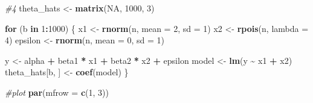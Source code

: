 \documentclass[
]{article}
\newenvironment{Shaded}{\begin{snugshade}}{\end{snugshade}}
\newcommand{\AttributeTok}[1]{\textcolor[rgb]{0.13,0.29,0.53}{#1}}
\newcommand{\CommentTok}[1]{\textcolor[rgb]{0.56,0.35,0.01}{\textit{#1}}}
\newcommand{\ConstantTok}[1]{\textcolor[rgb]{0.56,0.35,0.01}{#1}}
\newcommand{\ControlFlowTok}[1]{\textcolor[rgb]{0.13,0.29,0.53}{\textbf{#1}}}
\newcommand{\DecValTok}[1]{\textcolor[rgb]{0.00,0.00,0.81}{#1}}
\newcommand{\FunctionTok}[1]{\textcolor[rgb]{0.13,0.29,0.53}{\textbf{#1}}}
\newcommand{\NormalTok}[1]{#1}
\newcommand{\OtherTok}[1]{\textcolor[rgb]{0.56,0.35,0.01}{#1}}
\newcommand{\SpecialCharTok}[1]{\textcolor[rgb]{0.81,0.36,0.00}{\textbf{#1}}}
\begin{document}
\begin{Shaded}
\begin{Highlighting}[]
\CommentTok{\#4}
\NormalTok{theta\_hats }\OtherTok{\textless{}{-}} \FunctionTok{matrix}\NormalTok{(}\ConstantTok{NA}\NormalTok{, }\DecValTok{1000}\NormalTok{, }\DecValTok{3}\NormalTok{) }

\ControlFlowTok{for}\NormalTok{ (b }\ControlFlowTok{in} \DecValTok{1}\SpecialCharTok{:}\DecValTok{1000}\NormalTok{) \{}
\NormalTok{  x1 }\OtherTok{\textless{}{-}} \FunctionTok{rnorm}\NormalTok{(n, }\AttributeTok{mean =} \DecValTok{2}\NormalTok{, }\AttributeTok{sd =} \DecValTok{1}\NormalTok{)}
\NormalTok{  x2 }\OtherTok{\textless{}{-}} \FunctionTok{rpois}\NormalTok{(n, }\AttributeTok{lambda =} \DecValTok{4}\NormalTok{)}
\NormalTok{  epsilon }\OtherTok{\textless{}{-}} \FunctionTok{rnorm}\NormalTok{(n, }\AttributeTok{mean =} \DecValTok{0}\NormalTok{, }\AttributeTok{sd =} \DecValTok{1}\NormalTok{)}
  
\NormalTok{  y }\OtherTok{\textless{}{-}}\NormalTok{ alpha }\SpecialCharTok{+}\NormalTok{ beta1 }\SpecialCharTok{*}\NormalTok{ x1 }\SpecialCharTok{+}\NormalTok{ beta2 }\SpecialCharTok{*}\NormalTok{ x2 }\SpecialCharTok{+}\NormalTok{ epsilon}
\NormalTok{  model }\OtherTok{\textless{}{-}} \FunctionTok{lm}\NormalTok{(y }\SpecialCharTok{\textasciitilde{}}\NormalTok{ x1 }\SpecialCharTok{+}\NormalTok{ x2)}
\NormalTok{  theta\_hats[b, ] }\OtherTok{\textless{}{-}} \FunctionTok{coef}\NormalTok{(model)}
\NormalTok{\}}

\CommentTok{\#plot}
\FunctionTok{par}\NormalTok{(}\AttributeTok{mfrow =} \FunctionTok{c}\NormalTok{(}\DecValTok{1}\NormalTok{, }\DecValTok{3}\NormalTok{))  }


\end{Highlighting}
\end{Shaded}
\end{document}
